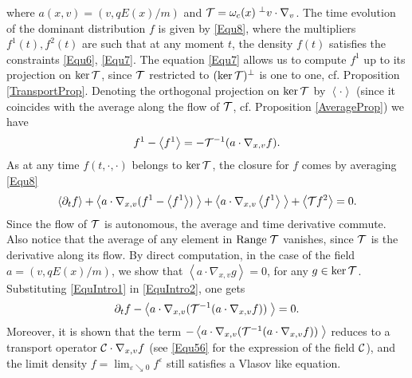 \documentclass[12pt, a4paper]{article}
\newcommand{\red}{\textcolor{red!95!black}}
\newcommand{\fe}[0]{
f ^\varepsilon}
\newcommand{\fo}[0]{
f ^1}
\newcommand{\ran}[0]{
\mathrm{Range\;}}
\newcommand{\oc}[0]{
\omega _c (x)}
\newcommand{\ave}[1]{
\left \langle #1 \right \rangle }
\newcommand{\lime}[0]{
\lim _{\varepsilon \searrow 0}}
\begin{document}
where $a(x,v) = (v, q E(x)/m)$ and ${\cal T} = \oc \;^{\perp}v\cdot \nabla _v$. The time evolution of the dominant distribution $f$ is given by \eqref{Equ8}, where the multipliers $f^1 (t), f^2(t)$ are such that at any moment $t$, the density $f(t)$ satisfies the constraints \eqref{Equ6}, \eqref{Equ7}. \red{The equation \eqref{Equ7} allows us to compute $\fo$ up to its projection on $\ker {\cal T}$, since ${\cal T}$ restricted to $(\ker {\cal T})^\perp$ is one to one, cf. Proposition \ref{TransportProp}. Denoting the orthogonal projection on $\ker {\cal T}$ by $\ave{\cdot}$ (since it coincides with the average along the flow of ${\cal T}$, cf. Proposition \ref{AverageProp}) we have
\begin{align}
\label{EquIntro1} 
\fo - \ave{\fo} = - {\cal T} ^{-1} ( a \cdot \nabla _{x,v} f).
\end{align}
As at any time $f(t,\cdot, \cdot)$ belongs to $\ker {\cal T}$, the closure for $f$ comes by averaging \eqref{Equ8}
\begin{equation}
\label{EquIntro2} \ave{\partial _t f } + \ave{a \cdot \nabla _{x,v} ( \fo - \ave{\fo})\;} + \ave{ a \cdot \nabla _{x,v} \ave{\fo}\;} + \ave{{\cal T} f^2} = 0.
\end{equation}
Since the flow of ${\cal T}$ is autonomous, the average and time derivative commute. Also notice that the average of any element in $\ran {\cal T}$ vanishes, since ${\cal T}$ is the derivative along its flow. By direct computation, in the case of the field $a = (v, qE(x)/m)$, we show that $\ave{a \cdot \nabla _{x,v} g } = 0$, for any $g \in \ker {\cal T}$. Substituting \eqref{EquIntro1} in \eqref{EquIntro2}, one gets
\begin{equation}
\label{EquContClosure} \partial _t f - \ave{ a \cdot \nabla _{x,v} ( {\cal T} ^{-1} ( a \cdot \nabla _{x,v} f ) ) \;} = 0.
\end{equation}
Moreover, it is shown that the term $- \ave{ a \cdot \nabla _{x,v} ( {\cal T} ^{-1} ( a \cdot \nabla _{x,v} f ) ) \;}$ reduces to a transport operator ${\cal C} \cdot \nabla _{x,v}f$ (see \eqref{Equ56} for the expression of the field ${\cal C}$), and the limit density $f = \lime \fe$ still satisfies a Vlasov like equation. 
}
\end{document}
